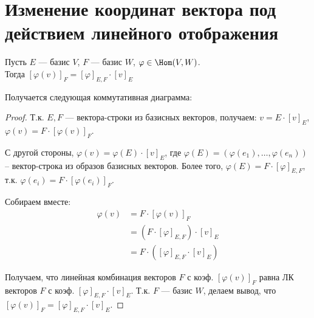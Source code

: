\section{Изменение координат вектора под действием линейного отображения}
\begin{theorem}
    Пусть $E$ --- базис $V$, $F$ --- базис $W$, $\varphi \in \Hom(V, W)$. \\
    Тогда $[\varphi(v)]_F = [\varphi]_{E, F} \cdot [v]_E$
\end{theorem}
Получается следующая коммутативная диаграмма:
\begin{center}
\end{center}
\begin{proof}
    Т.к. $E, F$ --- вектора-строки из базисных векторов, получаем: 
    $v = E \cdot [v]_E$,  $\varphi(v) = F \cdot [\varphi(v)]_F$.

    С другой стороны, $\varphi(v) = \varphi(E) \cdot [v]_E$, где
    $\varphi(E) = (\varphi(e_1), \dots, \varphi(e_n))$ -- вектор-строка
    из образов базисных векторов. Более того, 
    $\varphi(E) = F \cdot [\varphi]_{E, F}$, т.к. 
    $\varphi(e_i) = F \cdot [\varphi(e_i)]_F$.

    Собираем вместе:
    \begin{align*}
        \varphi(v) &= F \cdot [\varphi(v)]_F \\
        &= (F \cdot [\varphi]_{E, F}) \cdot [v]_E \\
        &= F \cdot ([\varphi]_{E, F} \cdot [v]_E)
    \end{align*}

    Получаем, что линейная комбинация векторов $F$ с коэф.
    $[\varphi(v)]_F$ равна ЛК векторов $F$ с коэф.
    $[\varphi]_{E, F} \cdot [v]_E$. Т.к. $F$ --- базис $W$, делаем вывод,
    что $[\varphi(v)]_F = [\varphi]_{E, F} \cdot [v]_E$.
\end{proof}

